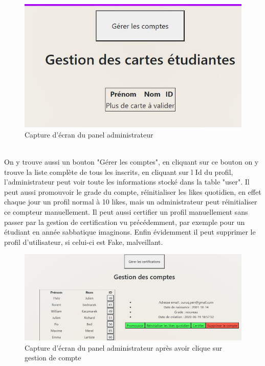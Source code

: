\documentclass[12pt]{report}
\begin{document}
\begin{figure}[h!]
	\begin{center}
		\includegraphics[scale=0.7]{gestioncarte.jpg}
	\end{center}
		\caption{Capture d'écran du panel administrateur }
\end{figure}\\
On y trouve aussi un bouton "Gérer les comptes", en cliquant sur ce bouton on y trouve la liste complète de tous les inscrits, en cliquant sur l Id du profil, l'administrateur peut voir toute les informations stocké dans la table "user". Il peut aussi promouvoir le grade du compte, réinitialiser les likes quotidien, en effet chaque jour un profil normal à 10 likes, mais un administrateur peut réinitialiser ce compteur manuellement. Il peut aussi certifier un profil manuellement sans passer par la gestion de certification vu précédemment, par exemple pour un étudiant en année sabbatique imaginons. Enfin évidemment il peut supprimer le profil d'utilisateur, si celui-ci est Fake, malveillant.
\begin{figure}[h!]
	\begin{center}
		\includegraphics[scale=0.6]{gestioncompte.jpg}
	\end{center}
		\caption{Capture d'écran du panel administrateur après avoir clique sur gestion de compte}
\end{figure}\\
\clearpage
\end{document}
